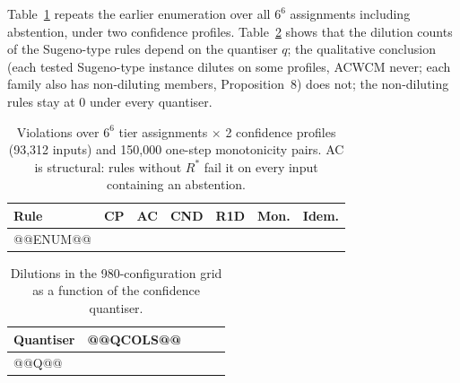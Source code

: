 \documentclass[11pt,a4paper]{article}%
\begin{document}
Table~\ref{tab:enum66} repeats the earlier enumeration over all $6^6$ assignments including abstention, under two confidence profiles. Table~\ref{tab:quant} shows that the dilution counts of the Sugeno-type rules depend on the quantiser $q$; the qualitative conclusion (each tested Sugeno-type instance dilutes on some profiles, ACWCM never; each family also has non-diluting members, Proposition~8) does not; the non-diluting rules stay at 0 under every quantiser.

\begin{table}[h]
\caption{Violations over $6^6$ tier assignments $\times$ 2 confidence profiles (93{,}312 inputs) and 150{,}000 one-step monotonicity pairs. AC is structural: rules without $R^*$ fail it on every input containing an abstention.}\label{tab:enum66}
\small
\begin{tabular}{@{}lrrrrrr@{}}
\toprule
Rule & CP & AC & CND & R1D & Mon. & Idem. \\
\midrule
@@ENUM@@
\bottomrule
\end{tabular}
\end{table}

\begin{table}[h]
\caption{Dilutions in the 980-configuration grid as a function of the confidence quantiser.}\label{tab:quant}
\small
\begin{tabular}{@{}lrrrr@{}}
\toprule
Quantiser & @@QCOLS@@ \\
\midrule
@@Q@@
\bottomrule
\end{tabular}
\end{table}
\end{document}

